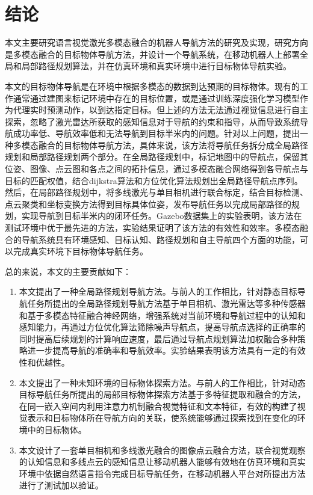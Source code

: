 \chapter{结\texorpdfstring{\quad}{}论}

本文主要研究语言视觉激光多模态融合的机器人导航方法的研究及实现，研究方向是多模态融合的目标物体导航方法，并设计一个导航系统，在移动机器人上部署全局和局部路径规划算法，并在仿真环境和真实环境中进行目标物体导航实验。
	
本文的目标物体导航是在环境中根据多模态的数据到达预期的目标物体。现有的工作通常通过建图来标记环境中存在的目标位置，或是通过训练深度强化学习模型作为代理实时预测动作，以到达指定目标。但上述的方法无法通过视觉信息进行自主探索，忽略了激光雷达所获取的感知信息对于导航的约束和指导，从而导致系统导航成功率低、导航效率低和无法导航到目标半米内的问题。针对以上问题，提出一种多模态融合的目标物体导航方法，具体来说，该方法将导航任务拆分成全局路径规划和局部路径规划两个部分。在全局路径规划中，标记地图中的导航点，保留其位姿、图像、点云图和各点之间的拓扑信息，通过多模态融合网络得到各导航点与目标的匹配权值，结合dijkstra算法和方位优化算法规划出全局路径导航点序列。然后，在局部路径规划中，将多线激光与单目相机进行联合标定，结合目标检测、点云聚类和坐标变换方法得到目标具体位姿，发布导航任务以完成局部路径的规划，实现导航到目标半米内的闭环任务。Gazebo数据集上的实验表明，该方法在测试环境中优于最先进的方法，实验结果证明了该方法的有效性和效率。多模态融合的导航系统具有环境感知、目标认知、路径规划和自主导航四个方面的功能，可以完成真实环境下目标物体导航任务。

总的来说，本文的主要贡献如下：
\begin{enumerate}[topsep = 0 pt, itemsep= 0 pt, parsep=0pt, partopsep=0pt, leftmargin=44pt, itemindent=0pt, labelsep=6pt, label=(\arabic*)]
    \item 	本文提出了一种全局路径规划导航方法。与前人的工作相比，针对静态目标导航任务所提出的全局路径规划导航方法基于单目相机、激光雷达等多种传感器和基于多模态特征融合神经网络，增强系统对当前环境和导航过程中的认知和感知能力，再通过方位优化算法筛除噪声导航点，提高导航点选择的正确率的同时提高后续规划的计算响应速度，最后通过导航点规划算法加权融合多种策略进一步提高导航的准确率和导航效率。实验结果表明该方法具有一定的有效性和优越性。
    \item	本文提出了一种未知环境的目标物体探索方法。与前人的工作相比，针对动态目标导航任务所提出的局部目标物体探索方法基于多特征提取和融合的方法，在同一嵌入空间内利用注意力机制融合视觉特征和文本特征，有效的构建了视觉表示和目标物体所在导航方向的关联，使系统能够通过探索找到在变化的环境中的目标物体。
    \item	本文设计了一套单目相机和多线激光融合的图像点云融合方法，联合视觉观察的认知信息和多线点云的感知信息让移动机器人能够有效地在仿真环境和真实环境中依据自然语言指令完成目标导航任务，在移动机器人平台对所提出方法进行了测试加以验证。
\end{enumerate}



